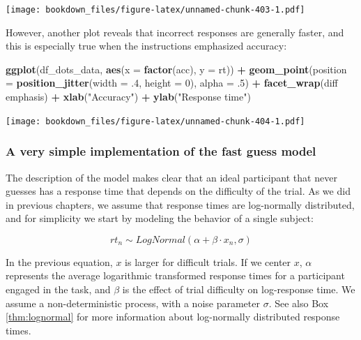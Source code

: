 \documentclass[12pt,]{krantz}
\newenvironment{Shaded}{\begin{snugshade}}{\end{snugshade}}
\newcommand{\KeywordTok}[1]{\textcolor[rgb]{0.13,0.29,0.53}{\textbf{#1}}}
\newcommand{\DataTypeTok}[1]{\textcolor[rgb]{0.13,0.29,0.53}{#1}}
\newcommand{\DecValTok}[1]{\textcolor[rgb]{0.00,0.00,0.81}{#1}}
\newcommand{\FloatTok}[1]{\textcolor[rgb]{0.00,0.00,0.81}{#1}}
\newcommand{\StringTok}[1]{\textcolor[rgb]{0.31,0.60,0.02}{#1}}
\newcommand{\OperatorTok}[1]{\textcolor[rgb]{0.81,0.36,0.00}{\textbf{#1}}}
\newcommand{\NormalTok}[1]{#1}
\theoremstyle{definition}
\theoremstyle{definition}
\theoremstyle{definition}
\theoremstyle{remark}
\begin{document}
\texttt{[image: bookdown\_files/figure-latex/unnamed-chunk-403-1.pdf]}

However, another plot reveals that incorrect responses are generally
faster, and this is especially true when the instructions emphasized
accuracy:

\begin{Shaded}
\begin{Highlighting}[]
\KeywordTok{ggplot}\NormalTok{(df_dots_data, }\KeywordTok{aes}\NormalTok{(}\DataTypeTok{x =} \KeywordTok{factor}\NormalTok{(acc), }\DataTypeTok{y =}\NormalTok{ rt)) }\OperatorTok{+}
\StringTok{  }\KeywordTok{geom_point}\NormalTok{(}\DataTypeTok{position =} \KeywordTok{position_jitter}\NormalTok{(}\DataTypeTok{width =} \FloatTok{.4}\NormalTok{, }\DataTypeTok{height =} \DecValTok{0}\NormalTok{),}
             \DataTypeTok{alpha =} \FloatTok{.5}\NormalTok{) }\OperatorTok{+}
\StringTok{  }\KeywordTok{facet_wrap}\NormalTok{(diff }\OperatorTok{~}\StringTok{ }\NormalTok{emphasis) }\OperatorTok{+}
\StringTok{  }\KeywordTok{xlab}\NormalTok{(}\StringTok{"Accuracy"}\NormalTok{) }\OperatorTok{+}
\StringTok{  }\KeywordTok{ylab}\NormalTok{(}\StringTok{"Response time"}\NormalTok{)}
\end{Highlighting}
\end{Shaded}

\texttt{[image: bookdown\_files/figure-latex/unnamed-chunk-404-1.pdf]}

\subsubsection{A very simple implementation of the fast guess
model}\label{a-very-simple-implementation-of-the-fast-guess-model}

The description of the model makes clear that an ideal participant that
never guesses has a response time that depends on the difficulty of the
trial. As we did in previous chapters, we assume that response times are
log-normally distributed, and for simplicity we start by modeling the
behavior of a single subject:

\begin{equation}
rt_n \sim LogNormal(\alpha + \beta \cdot x_n, \sigma)
\end{equation}

In the previous equation, \(x\) is larger for difficult trials. If we
center \(x\), \(\alpha\) represents the average logarithmic transformed
response times for a participant engaged in the task, and \(\beta\) is
the effect of trial difficulty on log-response time. We assume a
non-deterministic process, with a noise parameter \(\sigma\). See also
Box \ref{thm:lognormal} for more information about log-normally
distributed response times.
\end{document}
